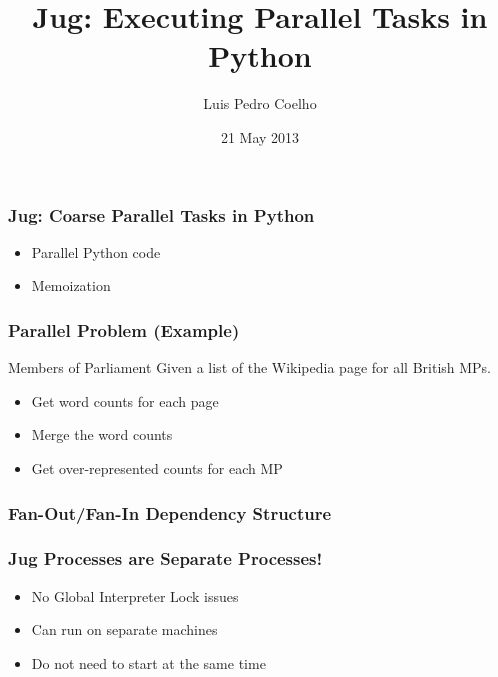 \documentclass{beamer}
\title[Jug]{Jug: Executing Parallel Tasks in Python}
\author{Luis Pedro Coelho}
\institute{EMLB}
\date{21 May 2013}
\begin{document}
\frame{\titlepage}

\begin{frame}[fragile]
\frametitle{Jug: Coarse Parallel Tasks in Python}

\begin{itemize}
\item Parallel Python code
\item Memoization
\end{itemize}
\end{frame}

\begin{frame}[fragile]
\frametitle{Parallel Problem (Example)}

\begin{block}{Members of Parliament}
Given a list of the Wikipedia page for all British MPs.
\begin{itemize}
\item Get word counts for each page
\item Merge the word counts
\item Get over-represented counts for each MP
\end{itemize}
\end{block}

\end{frame}

\begin{frame}[fragile]
\frametitle{Fan-Out/Fan-In Dependency Structure}

\begin{center}

\end{center}

\end{frame}

\begin{frame}[fragile]
\frametitle{Jug Processes are Separate Processes!}
\begin{itemize}
\item \alert{No Global Interpreter Lock} issues
\item Can run on \alert{separate machines}
\item Do not need to start at the same time
\end{itemize}
\end{frame}
\end{document}
